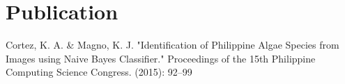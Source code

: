 \documentclass[top=0in]{deedy-resume-openfont}
\begin{document}
\begin{minipage}[t]{0.66\textwidth}
%
%

%


\section{Publication}\label{sec:publications}
\renewcommand\refname{\vskip -1.5em} %
Cortez, K. A. \& Magno, K. J. "Identification of Philippine Algae Species from Images using Naive Bayes Classifier."
Proceedings of the 15th Philippine Computing Science Congress. (2015): 92--99
%
%

\end{minipage} 
\end{document}
